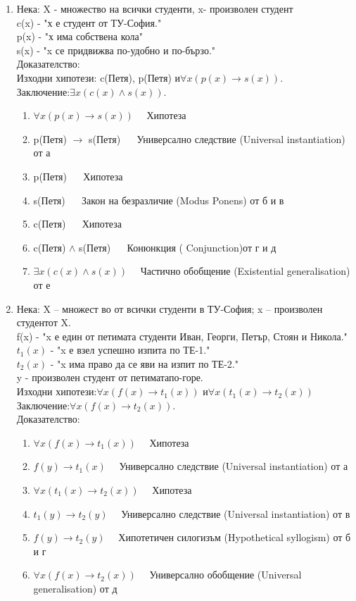 \documentclass[fleqn, 12pt]{article}
\theoremstyle{definition}
\begin{document}
\begin{enumerate}
\item Нека: X - множество на всички студенти, x- произволен студент\\
c(x) - "х е студент от ТУ-София."\\
p(x) - "х    има собствена кола"\\
s(x) - "x се придвижва по-удобно и по-бързо."\\
Доказателство: \\
Изходни хипотези: c(Петя), p(Петя) и$\forall x( p(x) \to s(x) )$. \\
Заключение:$\exists x( c(x) \land s (x) )$.
\begin{enumerate}
\item $\forall x( p(x) \to s(x) ) \quad$ Хипотеза
\item p(Петя) $\to$ s(Петя) $\quad$ Универсално следствие (Universal instantiation) от а
\item p(Петя) $\quad$ Хипотеза
\item s(Петя) $\quad$ Закон на безразличие (Modus Ponens) от б и в 
\item c(Петя) $\quad$ Хипотеза
\item c(Петя) $\land$ s(Петя)  $\quad $ Конюнкция ( Conjunction)от г и д 
\item $\exists x( c(x) \land s (x) ) \quad$ Частично обобщение (Existential generalisation) от е
\end{enumerate}
\item Нека: X  – множест  во от всички студенти в ТУ-София; x  – произволен студентот X.\\ 
f(x) - "x е един от петимата студенти Иван, Георги, Петър, Стоян и Никола."\\
$t_1(x)$ - "x е взел успешно изпита по ТЕ-1."\\
$t_2(x)$ - "x има право да се яви на изпит по ТЕ-2."\\
y - произволен студент от петиматапо-горе. \\
Изходни хипотези:$\forall x(f(x) \to t_1(x))$ и$\forall x(t_1(x) \to  t_2(x))$ \\
Заключение:$\forall x(f(x) \to t_2(x))$. \\
Доказателство:
\begin{enumerate}
\item $\forall x(f(x) \to t_1(x)) \quad $ Хипотеза 
\item $f(y) \to t_1(x) \quad $ Универсално следствие (Universal instantiation) от а
\item $\forall x(t_1(x) \to  t_2(x)) \quad  $ Хипотеза
\item $t_1(y) \to  t_2(y) \quad $ Универсално следствие (Universal instantiation) от в
\item $f(y) \to  t_2(y) \quad $ Хипотетичен силогизъм (Hypothetical syllogism) от б и г
\item $\forall x(f(x) \to t_2(x)) \quad $ Универсално обобщение (Universal generalisation) от д 
\end{enumerate}
\end{enumerate}
\end{document}
